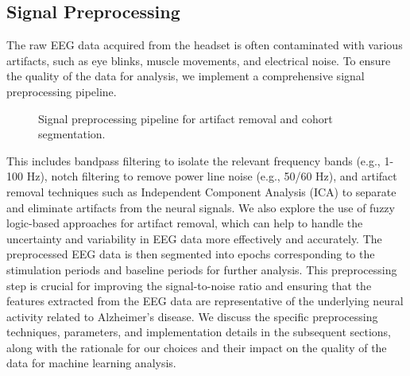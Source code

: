 \documentclass[openany]{book}
\begin{document}
\subsection{Signal Preprocessing}
The raw EEG data acquired from the headset is often contaminated with various artifacts, such as eye blinks, muscle movements, and electrical noise. To ensure the quality of the data for analysis, we implement a comprehensive signal preprocessing pipeline. 

\begin{figure}[htpb]
    \centering
    \caption{Signal preprocessing pipeline for artifact removal and cohort segmentation.}
    \label{fig:preprocessing}
\end{figure}

This includes bandpass filtering to isolate the relevant frequency bands (e.g., 1-100 Hz), notch filtering to remove power line noise (e.g., 50/60 Hz), and artifact removal techniques such as Independent Component Analysis (ICA) to separate and eliminate artifacts from the neural signals. We also explore the use of fuzzy logic-based approaches for artifact removal, which can help to handle the uncertainty and variability in EEG data more effectively and accurately. The preprocessed EEG data is then segmented into epochs corresponding to the stimulation periods and baseline periods for further analysis. This preprocessing step is crucial for improving the signal-to-noise ratio and ensuring that the features extracted from the EEG data are representative of the underlying neural activity related to Alzheimer's disease. We discuss the specific preprocessing techniques, parameters, and implementation details in the subsequent sections, along with the rationale for our choices and their impact on the quality of the data for machine learning analysis. \\
\end{document}
